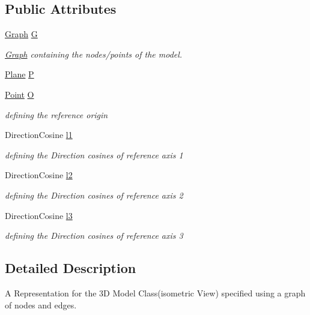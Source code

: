 \subsection*{Public Attributes}
\begin{DoxyCompactItemize}
\item 
\mbox{\hyperlink{class_graph}{Graph}} \mbox{\hyperlink{class_model3d_a829515bcb9101d6cb75d9a7bd4ebe866}{G}}
\begin{DoxyCompactList}\small\item\em \mbox{\hyperlink{class_graph}{Graph}} containing the nodes/points of the model. \end{DoxyCompactList}\item 
\mbox{\hyperlink{class_plane}{Plane}} \mbox{\hyperlink{class_model3d_ab7f731b1e8f73853a6c20128789df465}{P}}
\item 
\mbox{\hyperlink{class_point}{Point}} \mbox{\hyperlink{class_model3d_a0b3566bc28cf3f7db521492d701ffc40}{O}}
\begin{DoxyCompactList}\small\item\em defining the reference origin \end{DoxyCompactList}\item 
Direction\+Cosine \mbox{\hyperlink{class_model3d_a25fe8f02e27963f4258e33e111767a91}{l1}}
\begin{DoxyCompactList}\small\item\em defining the Direction cosines of reference axis 1 \end{DoxyCompactList}\item 
Direction\+Cosine \mbox{\hyperlink{class_model3d_a5fdb6197364007eb98da77f39e19a5b2}{l2}}
\begin{DoxyCompactList}\small\item\em defining the Direction cosines of reference axis 2 \end{DoxyCompactList}\item 
Direction\+Cosine \mbox{\hyperlink{class_model3d_a55a8acbf54092ba872e2ba06f719f9a5}{l3}}
\begin{DoxyCompactList}\small\item\em defining the Direction cosines of reference axis 3 \end{DoxyCompactList}\end{DoxyCompactItemize}


\subsection{Detailed Description}
A Representation for the 3D Model Class(isometric View) specified using a graph of nodes and edges. 

